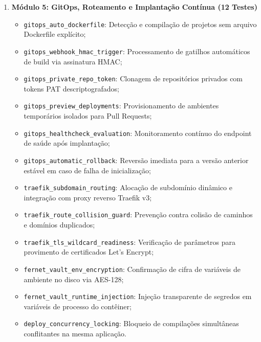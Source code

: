 \begin{enumerate}
    \item \textbf{Módulo 5: GitOps, Roteamento e Implantação Contínua (12 Testes)}
    \begin{itemize}
        \item \texttt{gitops\_auto\_dockerfile}: Detecção e compilação de projetos sem arquivo Dockerfile explícito;
        \item \texttt{gitops\_webhook\_hmac\_trigger}: Processamento de gatilhos automáticos de build via assinatura HMAC;
        \item \texttt{gitops\_private\_repo\_token}: Clonagem de repositórios privados com tokens PAT descriptografados;
        \item \texttt{gitops\_preview\_deployments}: Provisionamento de ambientes temporários isolados para Pull Requests;
        \item \texttt{gitops\_healthcheck\_evaluation}: Monitoramento contínuo do endpoint de saúde após implantação;
        \item \texttt{gitops\_automatic\_rollback}: Reversão imediata para a versão anterior estável em caso de falha de inicialização;
        \item \texttt{traefik\_subdomain\_routing}: Alocação de subdomínio dinâmico e integração com proxy reverso Traefik v3;
        \item \texttt{traefik\_route\_collision\_guard}: Prevenção contra colisão de caminhos e domínios duplicados;
        \item \texttt{traefik\_tls\_wildcard\_readiness}: Verificação de parâmetros para provimento de certificados Let's Encrypt;
        \item \texttt{fernet\_vault\_env\_encryption}: Confirmação de cifra de variáveis de ambiente no disco via AES-128;
        \item \texttt{fernet\_vault\_runtime\_injection}: Injeção transparente de segredos em variáveis de processo do contêiner;
        \item \texttt{deploy\_concurrency\_locking}: Bloqueio de compilações simultâneas conflitantes na mesma aplicação.
    \end{itemize}


\end{enumerate}
